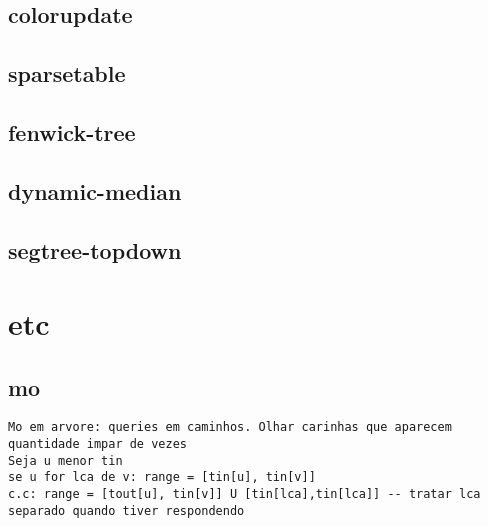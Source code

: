 \vspace{-2pt}
\subsection{colorupdate}
\vspace{-5pt}
\raggedbottom
\hrulefill

\vspace{-2pt}
\subsection{sparsetable}
\vspace{-5pt}
\raggedbottom
\hrulefill

\vspace{-2pt}
\subsection{fenwick-tree}
\vspace{-5pt}
\raggedbottom
\hrulefill

\vspace{-2pt}
\subsection{dynamic-median}
\vspace{-5pt}
\raggedbottom
\hrulefill

\vspace{-2pt}
\subsection{segtree-topdown}
\vspace{-5pt}
\raggedbottom
\hrulefill


\section{etc}
\vspace{-2pt}
\subsection{mo}
\vspace{-4pt}
\begin{lstlisting}[style=description]
Mo em arvore: queries em caminhos. Olhar carinhas que aparecem quantidade impar de vezes
Seja u menor tin
se u for lca de v: range = [tin[u], tin[v]]
c.c: range = [tout[u], tin[v]] U [tin[lca],tin[lca]] -- tratar lca separado quando tiver respondendo

\end{lstlisting}
\vspace{-5pt}
\raggedbottom
\hrulefill

